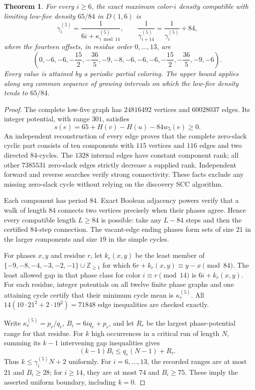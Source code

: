 \documentclass[11pt,reqno]{amsart}
\theoremstyle{plain}
\newtheorem{theorem}{Theorem}
\newcommand{\D}[1]{D(1,#1)}
\theoremstyle{plain}
\theoremstyle{plain}
\begin{document}
\begin{theorem}\label{M-thm:base-five-all-high}
For every $i\ge6$, the exact maximum color-$i$ density compatible with
limiting low-five density $65/84$ in $\D{6}$ is
\[
 \gamma_i^{(5)}=\frac1{6i+\kappa^{(5)}_{i\bmod14}},
 \qquad \frac1{\gamma_{i+14}^{(5)}}=\frac1{\gamma_i^{(5)}}+84,
\]
where the fourteen offsets, in residue order $0,\ldots,13$, are
\[
 \left(0,-6,-6,-\frac{15}{2},-\frac{36}{5},-9,-8,
       -6,-6,-6,-\frac{15}{2},-\frac{36}{5},-9,-6\right).
\]
Every value is attained by a periodic partial coloring. The upper bound
applies along any common sequence of growing intervals on which the
low-five density tends to $65/84$.
\end{theorem}

\begin{proof}
The complete low-five graph has $24816492$ vertices and $60028037$
edges. Its integer potential, with range $301$, satisfies
\[
 s(e)=65+H(v)-H(u)-84w_5(e)\ge0.
\]
An independent reconstruction of every edge proves that the complete
zero-slack cyclic part consists of ten components with $115$ vertices
and $116$ edges and two directed $84$-cycles. The $1328$ internal
edges have constant component rank; all other $7385531$ zero-slack
edges strictly decrease a supplied rank. Independent forward and reverse
searches verify strong connectivity. These facts exclude any missing
zero-slack cycle without relying on the discovery SCC algorithm.

Each component has period $84$. Exact Boolean adjacency powers verify
that a walk of length $84$ connects two vertices precisely when their
phases agree. Hence every compatible length $L\ge84$ is possible:
take any $L-84$ steps and then the certified $84$-step connection.
The vacant-edge ending phases form sets of size $21$ in the larger
components and size $19$ in the simple cycles.

For phases $x,y$ and residue $r$, let $k_r(x,y)$ be the least member
of $\{-9,-8,-4,-3,-2,-1\}\cup\mathbb Z_{\ge1}$ for which
$6r+k_r(x,y)\equiv y-x\pmod{84}$. The least allowed gap in that
phase class for color $i\equiv r\pmod{14}$ is $6i+k_r(x,y)$.
For each residue, integer potentials on all twelve finite phase graphs
and one attaining cycle certify that their minimum cycle mean is
$\kappa^{(5)}_r$. All $14(10\cdot21^2+2\cdot19^2)=71848$ edge
inequalities are checked exactly.

Write $\kappa^{(5)}_r=p_r/q_r$, $B_i=6iq_r+p_r$, and let $R_r$ be the
largest phase-potential range for that residue. For $k$ high occurrences
in a critical run of length $N$, summing its $k-1$ intervening gap
inequalities gives
\[
 (k-1)B_i\le q_r(N-1)+R_r.
\]
Thus $k\le\gamma_i^{(5)}N+2$ uniformly. For $i=6,\ldots,13$,
the recorded ranges are at most $21$ and $B_i\ge28$; for $i\ge14$,
they are at most $74$ and $B_i\ge75$. These imply the asserted
uniform boundary, including $k=0$.


\end{proof}
\end{document}
